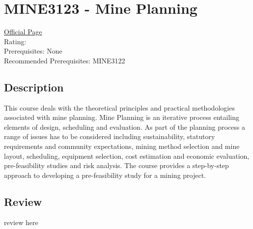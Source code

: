 \hypertarget{MINE3123}{\section{MINE3123 - Mine Planning}}

\large
\textcolor{turbo_purple}{\href{https://my.uq.edu.au/programs-courses/course.html?course_code=MINE3123}{Official Page}} \\
Rating: \cstar\cstar\cstar\cstar\ostar \\
Prerequisites: None \\
Recommended Prerequisites: MINE3122

\normalsize
\subsection*{Description}
This course deals with the theoretical principles and practical methodologies associated with mine planning.
Mine Planning is an iterative process entailing elements of design, scheduling and evaluation. As part of the planning process a range of issues has to be considered including sustainability, statutory requirements and community expectations, mining method selection and mine layout, scheduling, equipment selection, cost estimation and economic evaluation, pre-feasibility studies and risk analysis.
The course provides a step-by-step approach to developing a pre-feasibility study for a mining project.

\subsection*{Review}
review here
